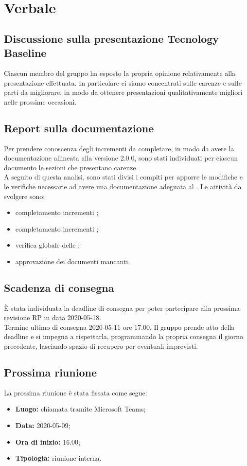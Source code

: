 \section{Verbale}

	\subsection{Discussione sulla presentazione Tecnology Baseline}
		Ciascun membro del gruppo ha esposto la propria opinione relativamente alla presentazione effettuata. In particolare ci siamo concentrati sulle carenze e sulle parti da migliorare, in modo da ottenere presentazioni qualitativamente migliori nelle prossime occasioni.
	
	
	\subsection{Report sulla documentazione}
		Per prendere conoscenza degli incrementi da completare, in modo da avere la documentazione allineata alla versione 2.0.0, sono stati individuati per ciascun documento le sezioni che presentano carenze.\\
		A seguito di questa analisi, sono stati divisi i compiti per apporre le modifiche e le verifiche necessarie ad avere una documentazione adeguata al \PdQ{}. Le attività da svolgere sono:
		\begin{itemize}
			\item completamento incrementi \PdP;
			\item completamento incrementi \PdQ;
			\item verifica globale delle \NdP;
			\item approvazione dei documenti mancanti.		
		\end{itemize}
	
	
	\subsection{Scadenza di consegna}
		È stata individuata la deadline di consegna per poter partecipare alla prossima revisione RP in data 2020-05-18.\\
		Termine ultimo di consegna 2020-05-11 ore 17.00. Il gruppo prende atto della deadline e si impegna a rispettarla, programmando la propria consegna il giorno precedente, lasciando spazio di recupero per eventuali imprevisti.
		
		
	\subsection{Prossima riunione}
		La prossima riunione è stata fissata come segue:
		\begin{itemize}
			\item \textbf{Luogo: } chiamata tramite Microsoft Teams; 
			\item \textbf{Data: } 2020-05-09;
			\item \textbf{Ora di inizio: } 16.00;
			\item \textbf{Tipologia: } riunione interna.
		\end{itemize}